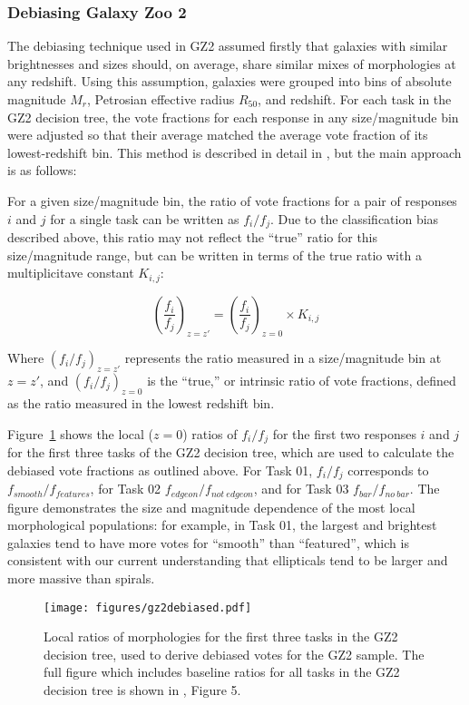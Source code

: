 \subsubsection{Debiasing Galaxy Zoo 2}

The debiasing technique used in GZ2 assumed firstly that galaxies with similar brightnesses and sizes should, on average, share similar mixes of morphologies at any redshift. Using this assumption, galaxies were grouped into bins of absolute magnitude $M_r$, Petrosian effective radius $R_{50}$, and redshift. For each task in the GZ2 decision tree, the vote fractions for each response in any size/magnitude bin were adjusted so that their average matched the average vote fraction of its lowest-redshift bin. This method is described in detail in \citet{Willet2013}, but the main approach is as follows:

For a given size/magnitude bin, the ratio of vote fractions for a pair of responses $i$ and $j$ for a single task can be written as $f_i/f_j$. Due to the classification bias described above, this ratio may not reflect the ``true'' ratio for this size/magnitude range, but can be written in terms of the true ratio with a multiplicitave constant $K_{i,j}$:

\begin{equation}
\left(\frac{f_i}{f_j}\right)_{z=z'} = \left(\frac{f_i}{f_j}\right)_{z=0} \times K_{i,j}
\label{eqn:fvspk}
\end{equation}

Where $(f_i/f_j)_{z=z'}$ represents the ratio measured in a size/magnitude bin at $z=z'$, and $(f_i/f_j)_{z=0}$ is the ``true,'' or intrinsic ratio of vote fractions, defined as the ratio measured in the lowest redshift bin.

Figure~\ref{fig:gz2debiased} shows the local ($z=0$) ratios of $f_i/f_j$ for the first two responses $i$ and $j$ for the first three tasks of the GZ2 decision tree, which are used to calculate the debiased vote fractions as outlined above. For Task 01, $f_i/f_j$ corresponds to $f_{smooth}/f_{features}$, for Task 02 $f_{edgeon}/f_{not~edgeon}$, and for Task 03 $f_{bar}/f_{no~bar}.$ The figure demonstrates the size and magnitude dependence of the most local morphological populations: for example, in Task 01, the largest and brightest galaxies tend to have more votes for ``smooth'' than ``featured'', which is consistent with our current understanding that ellipticals tend to be larger and more massive than spirals. 

\begin{figure}
\centering
\texttt{[image: figures/gz2debiased.pdf]}
\caption{Local ratios of morphologies for the first three tasks in the GZ2 decision tree, used to derive debiased votes for the GZ2 sample. The full figure which includes baseline ratios for all tasks in the GZ2 decision tree is shown in \citet{Willett2013}, Figure 5.}
\label{fig:gz2debiased}
\end{figure} 









